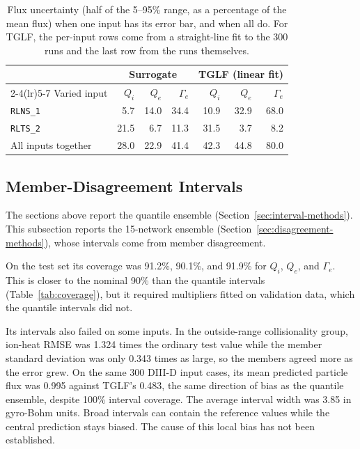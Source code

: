 \documentclass[12pt,letterpaper]{article}
\begin{document}
\begin{table}[htbp]
  \centering
  \small
  \begin{tabular}{lrrrrrr}
    \toprule
                        & \multicolumn{3}{c}{Surrogate} & \multicolumn{3}{c}{TGLF (linear fit)}                                           \\
    \cmidrule(lr){2-4}\cmidrule(lr){5-7}
    Varied input        & $Q_i$                         & $Q_e$                                 & $\Gamma_e$ & $Q_i$ & $Q_e$ & $\Gamma_e$ \\
    \midrule
    \texttt{RLNS\_1}    & 5.7                           & 14.0                                  & 34.4       & 10.9  & 32.9  & 68.0       \\
    \texttt{RLTS\_2}    & 21.5                          & 6.7                                   & 11.3       & 31.5  & 3.7   & 8.2        \\
    All inputs together & 28.0                          & 22.9                                  & 41.4       & 42.3  & 44.8  & 80.0       \\
    \bottomrule
  \end{tabular}
  \caption{Flux uncertainty (half of the 5--95\% range, as a percentage of the
    mean flux) when one input has its error bar, and when all do. For TGLF,
    the per-input rows come from a straight-line fit to the 300 runs and the
    last row from the runs themselves.}
  \label{tab:d3d-sensitivity}
\end{table}

\subsection{Member-Disagreement Intervals}
\label{sec:disagreement-results}

The sections above report the quantile ensemble
(Section~\ref{sec:interval-methods}). This subsection reports the
15-network ensemble (Section~\ref{sec:disagreement-methods}), whose
intervals come from member disagreement.

On the test set its coverage was 91.2\%, 90.1\%, and 91.9\% for $Q_i$, $Q_e$,
and $\Gamma_e$. This is closer to the nominal 90\% than the quantile intervals
(Table~\ref{tab:coverage}), but it required multipliers fitted on validation
data, which the quantile intervals did not.

Its intervals also failed on some inputs. In the outside-range collisionality
group, ion-heat RMSE was 1.324 times the ordinary test value while the member
standard deviation was only 0.343 times as large, so the members agreed more
as the error grew. On the same 300 DIII-D input cases, its mean predicted
particle flux was 0.995 against TGLF's 0.483, the same direction of bias as the
quantile ensemble, despite 100\% interval coverage. The average interval width
was 3.85 in gyro-Bohm units. Broad intervals can contain the reference values
while the central prediction stays biased. The cause of this local bias has not
been established.
\end{document}
